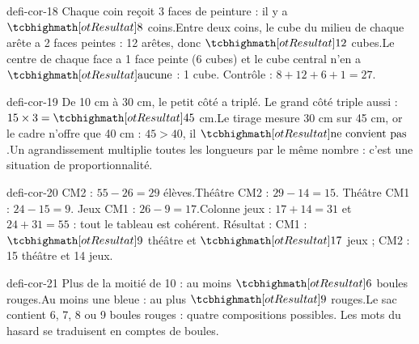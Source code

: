 \begin{blocEdition}{defi-cor-18}
Chaque coin reçoit 3 faces de peinture : il y a $\res8$ coins.Entre deux coins, le cube du milieu de chaque arête a 2 faces peintes : 12 arêtes, donc $\res{12}$ cubes.Le centre de chaque face a 1 face peinte (6 cubes) et le cube central n’en a $\res{\text{aucune}}$ : 1 cube. Contrôle : $8+12+6+1=27$.
\end{blocEdition}
\begin{blocEdition}{defi-cor-19}
De 10 cm à 30 cm, le petit côté a triplé. Le grand côté triple aussi : $15\times3=\res{45}$ cm.Le tirage mesure 30 cm sur 45 cm, or le cadre n’offre que 40 cm : $45>40$, il $\res{\text{ne convient pas}}$.Un agrandissement multiplie toutes les longueurs par le même nombre : c’est une situation de proportionnalité.
\end{blocEdition}
\begin{blocEdition}{defi-cor-20}
CM2 : $55-26=29$ élèves.Théâtre CM2 : $29-14=15$. Théâtre CM1 : $24-15=9$. Jeux CM1 : $26-9=17$.Colonne jeux : $17+14=31$ et $24+31=55$ : tout le tableau est cohérent. Résultat : CM1 : $\res{9}$ théâtre et $\res{17}$ jeux ; CM2 : 15 théâtre et 14 jeux.
\end{blocEdition}
\begin{blocEdition}{defi-cor-21}
Plus de la moitié de 10 : au moins $\res6$ boules rouges.Au moins une bleue : au plus $\res9$ rouges.Le sac contient 6, 7, 8 ou 9 boules rouges : quatre compositions possibles. Les mots du hasard se traduisent en comptes de boules.
\end{blocEdition}
